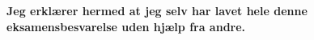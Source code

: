 \documentclass[12pt]{article}
\begin{document}
\begin{titlepage}
    
\end{titlepage}

\pagestyle{fancy}


\tableofcontents

\newpage

\begin{mdframed}
\bfseries
Jeg erklærer hermed at jeg selv har lavet hele denne eksamensbesvarelse uden hjælp fra andre.
\end{mdframed}


\newpage

\newpage

\newpage

\newpage

\end{document}
